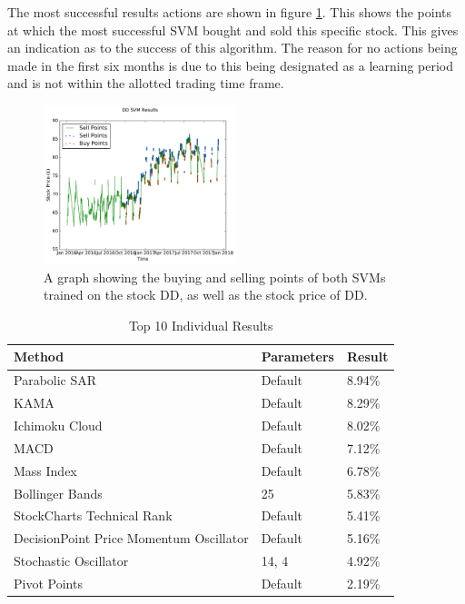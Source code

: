 \documentclass[conference]{IEEEtran}
\begin{document}
The most successful results actions are shown in figure \ref{fig:SVMResults}. This shows the points at which the most successful SVM bought and sold this specific stock. This gives an indication as to the success of this algorithm. The reason for no actions being made in the first six months is due to this being designated as a learning period and is not within the allotted trading time frame.

\begin{figure}
\includegraphics[width=0.5\textwidth, angle=0]{SVMResults.pdf}
\caption{A graph showing the buying and selling points of both SVMs trained on the stock DD, as well as the stock price of DD.}
\label{fig:SVMResults}
\end{figure}

\begin{table}
\centering
\begin{tabu}{ |p{4cm}|p{4cm}|p{4cm}|}\hline\hline
Method & Parameters & Result \\ \hline
Parabolic SAR & Default & 8.94\% \\ \hline
KAMA & Default & 8.29\% \\ \hline
Ichimoku Cloud & Default & 8.02\% \\ \hline
MACD & Default & 7.12\% \\ \hline
Mass Index & Default & 6.78\% \\ \hline
Bollinger Bands & 25 & 5.83\% \\ \hline
StockCharts Technical Rank & Default & 5.41\% \\ \hline
DecisionPoint Price Momentum Oscillator & Default & 5.16\% \\ \hline
Stochastic Oscillator & 14, 4 & 4.92\% \\ \hline
Pivot Points & Default & 2.19\% \\ \hline
\end{tabu}
\vspace{2 mm}
\caption{Top 10 Individual Results}
\label{fig: Table Individual Results}
\end{table}
\end{document}
